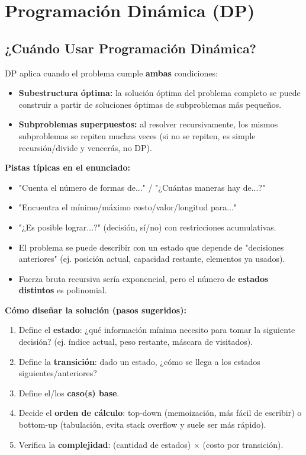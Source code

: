 \documentclass[10pt,twocolumn,letterpaper]{report}
\begin{document}
\chapter{Programación Dinámica (DP)}

\section{¿Cuándo Usar Programación Dinámica?}
DP aplica cuando el problema cumple \textbf{ambas} condiciones:
\begin{itemize}
    \item \textbf{Subestructura óptima:} la solución óptima del problema completo se puede construir a partir de soluciones óptimas de subproblemas más pequeños.
    \item \textbf{Subproblemas superpuestos:} al resolver recursivamente, los mismos subproblemas se repiten muchas veces (si no se repiten, es simple recursión/divide y vencerás, no DP).
\end{itemize}
\textbf{Pistas típicas en el enunciado:}
\begin{itemize}
    \item "Cuenta el número de formas de..." / "¿Cuántas maneras hay de...?"
    \item "Encuentra el mínimo/máximo costo/valor/longitud para..."
    \item "¿Es posible lograr...?" (decisión, sí/no) con restricciones acumulativas.
    \item El problema se puede describir con un estado que depende de "decisiones anteriores" (ej. posición actual, capacidad restante, elementos ya usados).
    \item Fuerza bruta recursiva sería exponencial, pero el número de \textbf{estados distintos} es polinomial.
\end{itemize}
\textbf{Cómo diseñar la solución (pasos sugeridos):}
\begin{enumerate}
    \item Define el \textbf{estado}: ¿qué información mínima necesito para tomar la siguiente decisión? (ej. índice actual, peso restante, máscara de visitados).
    \item Define la \textbf{transición}: dado un estado, ¿cómo se llega a los estados siguientes/anteriores?
    \item Define el/los \textbf{caso(s) base}.
    \item Decide el \textbf{orden de cálculo}: top-down (memoización, más fácil de escribir) o bottom-up (tabulación, evita stack overflow y suele ser más rápido).
    \item Verifica la \textbf{complejidad}: (cantidad de estados) $\times$ (costo por transición).
\end{enumerate}
\end{document}
